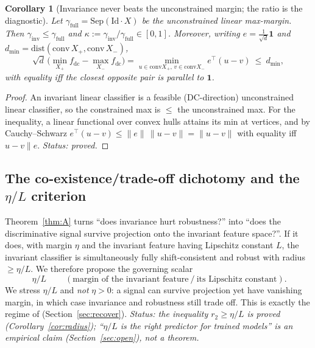 \documentclass[11pt]{article}
\theoremstyle{plain}
\newtheorem{corollary}{Corollary}
\theoremstyle{definition}
\theoremstyle{remark}
\newcommand{\fdc}{f_{\mathrm{dc}}}
\newcommand{\Sep}{\mathrm{Sep}}
\newcommand{\one}{\mathbf 1}
\newcommand{\inv}{\mathrm{inv}}
\begin{document}
\begin{corollary}[Invariance never beats the unconstrained margin; the ratio is the diagnostic]\label{cor:ratio}
Let $\gamma_{\mathrm{full}}=\Sep(\mathrm{Id}\cdot X)$ be the unconstrained linear max-margin. Then $\gamma_\inv\le\gamma_{\mathrm{full}}$ and $\kappa:=\gamma_\inv/\gamma_{\mathrm{full}}\in[0,1]$. Moreover, writing $e=\tfrac1{\sqrt d}\one$ and $d_{\min}=\mathrm{dist}(\mathrm{conv}\,X_+,\mathrm{conv}\,X_-)$,
\[
\sqrt d\,\big(\min_{X_+}\fdc-\max_{X_-}\fdc\big)=\min_{u\in\mathrm{conv}X_+,\,v\in\mathrm{conv}X_-} e^\top(u-v)\ \le\ d_{\min},
\]
with equality iff the closest opposite pair is parallel to $\one$.
\end{corollary}
\begin{proof}
An invariant linear classifier is a feasible (DC-direction) unconstrained linear classifier, so the constrained max is $\le$ the unconstrained max. For the inequality, a linear functional over convex hulls attains its min at vertices, and by Cauchy--Schwarz $e^\top(u-v)\le\|e\|\,\|u-v\|=\|u-v\|$ with equality iff $u-v\parallel e$. \emph{Status: proved.}
\end{proof}

\subsection{The co-existence/trade-off dichotomy and the $\eta/L$ criterion}\label{sec:dich}
Theorem~\ref{thm:A} turns ``does invariance hurt robustness?'' into ``does the discriminative signal survive projection onto the invariant feature space?''. If it does, with margin $\eta$ and the invariant feature having Lipschitz constant $L$, the invariant classifier is simultaneously fully shift-consistent and robust with radius $\ge\eta/L$. We therefore propose the governing scalar
\[
\boxed{\ \eta/L\ }\qquad(\text{margin of the invariant feature}\ /\ \text{its Lipschitz constant}).
\]
We stress $\eta/L$ and \emph{not} $\eta>0$: a signal can survive projection yet have vanishing margin, in which case invariance and robustness still trade off. This is exactly the regime of \citet{kamath2021canwehaveitall} (Section~\ref{sec:recover}). \emph{Status: the inequality $r_2\ge\eta/L$ is proved (Corollary~\ref{cor:radius}); ``$\eta/L$ is the right predictor for trained models'' is an empirical claim (Section~\ref{sec:open}), not a theorem.}
\end{document}
